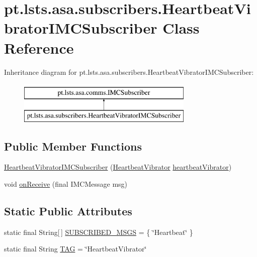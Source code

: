 \hypertarget{classpt_1_1lsts_1_1asa_1_1subscribers_1_1HeartbeatVibratorIMCSubscriber}{}\section{pt.\+lsts.\+asa.\+subscribers.\+Heartbeat\+Vibrator\+I\+M\+C\+Subscriber Class Reference}
\label{classpt_1_1lsts_1_1asa_1_1subscribers_1_1HeartbeatVibratorIMCSubscriber}
Inheritance diagram for pt.\+lsts.\+asa.\+subscribers.\+Heartbeat\+Vibrator\+I\+M\+C\+Subscriber\+:\begin{figure}[H]
\begin{center}
\leavevmode
\includegraphics[height=2.000000cm]{classpt_1_1lsts_1_1asa_1_1subscribers_1_1HeartbeatVibratorIMCSubscriber}
\end{center}
\end{figure}
\subsection*{Public Member Functions}
\begin{DoxyCompactItemize}
\item 
\hyperlink{classpt_1_1lsts_1_1asa_1_1subscribers_1_1HeartbeatVibratorIMCSubscriber_a5b904ada3aba570b408a6fb5c2780e26}{Heartbeat\+Vibrator\+I\+M\+C\+Subscriber} (\hyperlink{classpt_1_1lsts_1_1asa_1_1feedback_1_1HeartbeatVibrator}{Heartbeat\+Vibrator} \hyperlink{classpt_1_1lsts_1_1asa_1_1subscribers_1_1HeartbeatVibratorIMCSubscriber_a568d123e03e28a2e8ad4385d4227a743}{heartbeat\+Vibrator})
\item 
void \hyperlink{classpt_1_1lsts_1_1asa_1_1subscribers_1_1HeartbeatVibratorIMCSubscriber_a0d31422303e9422f732bce64f647d6ab}{on\+Receive} (final I\+M\+C\+Message msg)
\end{DoxyCompactItemize}
\subsection*{Static Public Attributes}
\begin{DoxyCompactItemize}
\item 
static final String\mbox{[}$\,$\mbox{]} \hyperlink{classpt_1_1lsts_1_1asa_1_1subscribers_1_1HeartbeatVibratorIMCSubscriber_a9153056f3639306e0cd124d25db53247}{S\+U\+B\+S\+C\+R\+I\+B\+E\+D\+\_\+\+M\+S\+G\+S} = \{ \char`\"{}Heartbeat\char`\"{} \}
\item 
static final String \hyperlink{classpt_1_1lsts_1_1asa_1_1subscribers_1_1HeartbeatVibratorIMCSubscriber_ae15a436e06007ae060a70852ed1b4ee4}{T\+A\+G} = \char`\"{}Heartbeat\+Vibrator\char`\"{}
\end{DoxyCompactItemize}
